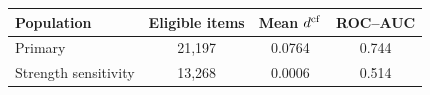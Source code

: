 \begin{tabular}{lccc}
\toprule
Population & Eligible items & Mean $d^{\rm cf}$ & ROC--AUC \\
\midrule
Primary & 21,197 & 0.0764 & 0.744 \\
Strength sensitivity & 13,268 & 0.0006 & 0.514 \\
\bottomrule
\end{tabular}
